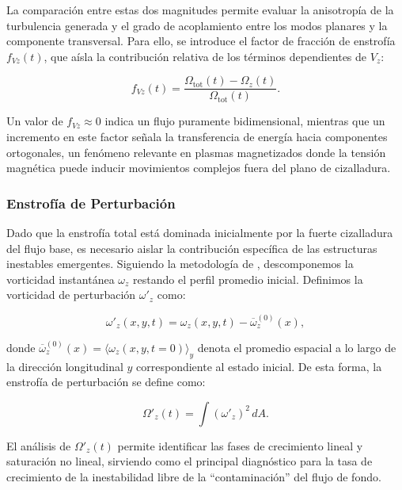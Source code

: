 \documentclass{article}
\begin{document}
La comparación entre estas dos magnitudes permite evaluar la anisotropía de la turbulencia generada y el grado de acoplamiento entre los modos planares y la componente transversal. Para ello, se introduce el factor de fracción de enstrofía $f_{Vz}(t)$, que aísla la contribución relativa de los términos dependientes de $V_z$:

\begin{equation}
    f_{Vz}(t) = \frac{\Omega_{\text{tot}}(t) - \Omega_z(t)}{\Omega_{\text{tot}}(t)}.
\end{equation}

Un valor de $f_{Vz} \approx 0$ indica un flujo puramente bidimensional, mientras que un incremento en este factor señala la transferencia de energía hacia componentes ortogonales, un fenómeno relevante en plasmas magnetizados donde la tensión magnética puede inducir movimientos complejos fuera del plano de cizalladura.

\subsubsection{Enstrofía de Perturbación}
Dado que la enstrofía total está dominada inicialmente por la fuerte cizalladura del flujo base, es necesario aislar la contribución específica de las estructuras inestables emergentes. Siguiendo la metodología de \parencite{zrake-2016, takamoto-2011}, descomponemos la vorticidad instantánea $\omega_z$ restando el perfil promedio inicial. Definimos la vorticidad de perturbación $\omega'_z$ como:

\begin{equation}
    \omega'_z(x, y, t) = \omega_z(x, y, t) - \overline{\omega}_z^{(0)}(x),
\end{equation}

\noindent donde $\overline{\omega}_z^{(0)}(x) = \langle \omega_z(x, y, t=0) \rangle_y$ denota el promedio espacial a lo largo de la dirección longitudinal $y$ correspondiente al estado inicial. De esta forma, la enstrofía de perturbación se define como:

\begin{equation}
    \Omega'_z(t) = \int (\omega'_z)^2 \, dA.
\end{equation}

El análisis de $\Omega'_z(t)$ permite identificar las fases de crecimiento lineal y saturación no lineal, sirviendo como el principal diagnóstico para la tasa de crecimiento de la inestabilidad libre de la ``contaminación'' del flujo de fondo.

\printbibliography
\end{document}
